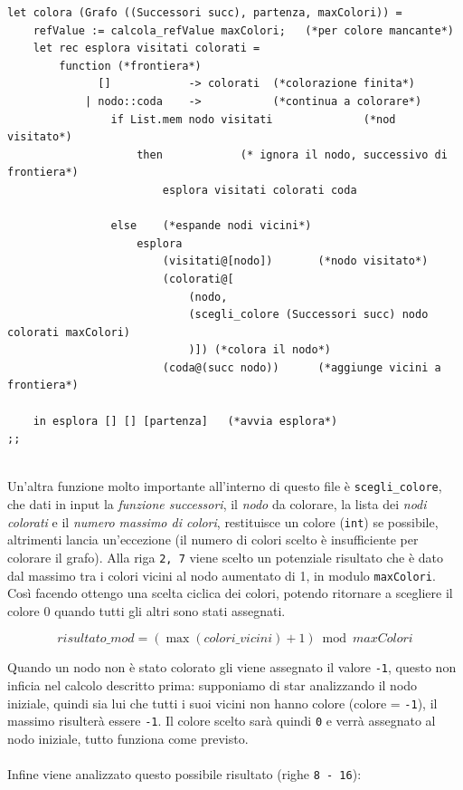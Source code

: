 \begin{lstlisting}[style=caml, caption={Funzione che si occupa della colorazione di un grafo.}, label=colora]
let colora (Grafo ((Successori succ), partenza, maxColori)) =
	refValue := calcola_refValue maxColori;   (*per colore mancante*)
	let rec esplora visitati colorati = 
		function (*frontiera*)
		 	  []            -> colorati  (*colorazione finita*)
			| nodo::coda    ->           (*continua a colorare*)
				if List.mem nodo visitati              (*nod visitato*)
					then 			(* ignora il nodo, successivo di frontiera*)
						esplora visitati colorati coda  

				else 	(*espande nodi vicini*)
					esplora 
						(visitati@[nodo])       (*nodo visitato*)
						(colorati@[
							(nodo, 
							(scegli_colore (Successori succ) nodo colorati maxColori)
							)]) (*colora il nodo*)
						(coda@(succ nodo))      (*aggiunge vicini a frontiera*)

	in esplora [] [] [partenza]   (*avvia esplora*)
;;
\end{lstlisting}
\ \\
Un'altra funzione molto importante all'interno di questo file è \lstinline[style=cmd]|scegli_colore|, che dati in input la \textit{funzione successori}, il \textit{nodo} da colorare, la lista dei \textit{nodi colorati} e il \textit{numero massimo di colori}, restituisce un colore (\lstinline[style=cmd]|int|) se possibile, altrimenti lancia un'eccezione (il numero di colori scelto è insufficiente per colorare il grafo). Alla riga \lstinline[style=cmd]|2, 7| viene scelto un potenziale risultato che è dato dal massimo tra i colori vicini al nodo aumentato di 1, in modulo \lstinline[style=cmd]|maxColori|. Così facendo ottengo una scelta ciclica dei colori, potendo ritornare a scegliere il colore 0 quando tutti gli altri sono stati assegnati.

\[
	risultato\_mod = (\max(colori\_vicini) + 1) \bmod maxColori
\]

\pagebreak
Quando un nodo non è stato colorato gli viene assegnato il valore \lstinline[style=cmd]|-1|, questo non inficia nel calcolo descritto prima: supponiamo di star analizzando il nodo iniziale, quindi sia lui che tutti i suoi vicini non hanno colore (colore = \lstinline[style=cmd]|-1|), il massimo risulterà essere \lstinline[style=cmd]|-1|. Il colore scelto sarà quindi \lstinline[style=cmd]|0| e verrà assegnato al nodo iniziale, tutto funziona come previsto.\\
\ \\
Infine viene analizzato questo possibile risultato (righe \lstinline[style=cmd]|8 - 16|):


